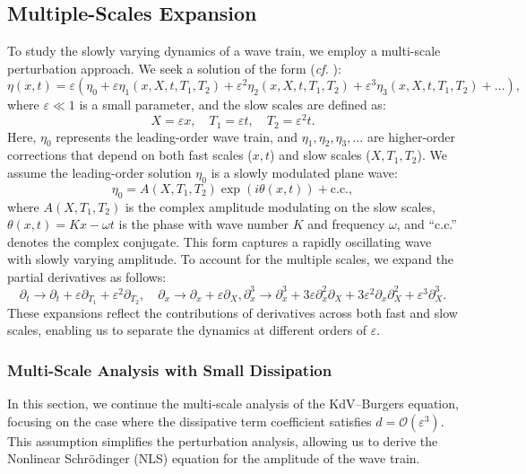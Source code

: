 \documentclass[alpha-refs, 12pt]{wiley-article}
\renewcommand{\O}{\mathcal{O}}
\newcommand{\eps}{\varepsilon}
\begin{document}
\subsection*{Multiple-Scales Expansion}

To study the slowly varying dynamics of a wave train, we employ a multi-scale perturbation approach. We seek a solution of the form (\emph{cf.} \cite{Dias2005}):
\begin{equation}
  \label{eq:ansatz}
  \eta(x,t) = \eps \left( \eta_0 + \eps \eta_1(x, X, t, T_1, T_2) + \eps^2 \eta_2(x, X, t, T_1, T_2) + \eps^3 \eta_3(x, X, t, T_1, T_2) + \dots \right),
\end{equation}
where $\eps \ll 1$ is a small parameter, and the slow scales are defined as:
\[
  X = \eps x, \quad T_1 = \eps t, \quad T_2 = \eps^2 t.
\]
Here, $\eta_0$ represents the leading-order wave train, and $\eta_1, \eta_2, \eta_3, \dots$ are higher-order corrections that depend on both fast scales ($x, t$) and slow scales ($X, T_1, T_2$). We assume the leading-order solution $\eta_0$ is a slowly modulated plane wave:
\begin{equation}\label{eq:wave_train}
  \eta_0 = A(X, T_1, T_2) \exp(i \theta(x, t)) + \text{c.c.},
\end{equation}
where $A(X, T_1, T_2)$ is the complex amplitude modulating on the slow scales, $\theta(x, t) = K x - \omega t$ is the phase with wave number $K$ and frequency $\omega$, and ``c.c.'' denotes the complex conjugate. This form captures a rapidly oscillating wave with slowly varying amplitude. To account for the multiple scales, we expand the partial derivatives as follows:
\begin{equation*}\label{eq:derivative_expansion}
  \partial_t \rightarrow \partial_t + \eps \partial_{T_1} + \eps^2 \partial_{T_2}, \quad \partial_x \rightarrow \partial_x + \eps \partial_X, \partial_x^3 \rightarrow \partial_x^3 + 3 \eps \partial_x^2 \partial_X + 3 \eps^2 \partial_x \partial_X^2 + \eps^3 \partial_X^3.
\end{equation*}
These expansions reflect the contributions of derivatives across both fast and slow scales, enabling us to separate the dynamics at different orders of $\eps$.

\subsubsection{Multi-Scale Analysis with Small Dissipation}

In this section, we continue the multi-scale analysis of the KdV--Burgers equation, focusing on the case where the dissipative term coefficient satisfies $d = \O(\eps^3)$. This assumption simplifies the perturbation analysis, allowing us to derive the Nonlinear Schr\"odinger (NLS) equation for the amplitude of the wave train.
\end{document}
